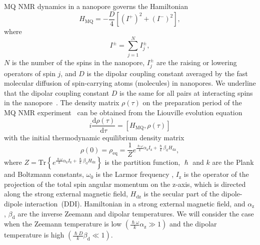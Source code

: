 \documentclass[review]{elsarticle}
\begin{document}
MQ NMR dynamics in a nanopore governs the Hamiltonian~\cite{Doronin_2019,Doronin_2009} 
%
\begin{equation}
    \label{eq:1}
    H_{\mathrm{MQ}} = - \dfrac{D}{4} \left[
        \left(I^{+}\right)^{2} 
        + \left(I^{-}\right)^{2} 
    \right] ,
\end{equation}
%
where 
%
\begin{equation}
    \label{eq:2}
    I^{\pm} = \sum\limits_{j=1}^{N} I_{j}^{\pm},
\end{equation}
%
$N$ is the number of the spins in the nanopore, $I^{\pm}_{j}$ are the raising or lowering operators of spin $j$, and $D$ is the dipolar coupling constant averaged by the fast molecular diffusion of spin-carrying atoms (molecules) in nanopores.
We underline that the dipolar coupling constant $D$ is the same for all pairs at interacting spins in the nanopore~\cite{Doronin_2019,Doronin_2009}.
The density matrix $\rho(\tau)$ on the preparation period of the MQ NMR experiment~\cite{Baum_1985} can be obtained from the Liouville evolution equation~\cite{Goldman_1970,Abragam_1982} 
%
\begin{equation}
    \label{eq:3}
    i\dfrac{\mathrm{d}\rho(\tau)}{\mathrm{d}\tau} = \left[
    H_\mathrm{MQ},\rho(\tau)
    \right]
\end{equation}
%
with the initial thermodynamic equilibrium density matrix 
%
\begin{equation}
    \label{eq:4}
       \rho(0) = \rho_\mathrm{eq} = \dfrac{1}{Z}
       e^{
            \frac{\hslash \omega}{k} \alpha_\mathrm{z} I_\mathrm{z} 
            + \frac{\hslash }{k} \beta_\mathrm{d} H_\mathrm{dz}
        },
\end{equation}
%
where 
$Z = \mathrm{Tr} \left\{ e^{\frac{\hslash \omega}{k} \alpha_\mathrm{z} I_\mathrm{z} + \frac{\hslash  }{k} \beta_\mathrm{d} H_\mathrm{dz}} \right\}$ is the partition function, 
$\hslash$ and $k$ are the Plank and Boltzmann constants, 
$\omega_{0}$  is the Larmor frequency , $I_\mathrm{z}$ is the operator of the projection of the total spin angular momentum on the z-axis, 
which is directed along the strong external magnetic field,  
$H_\mathrm{dz}$ is the secular part of the dipole-dipole interaction~(DDI).
Hamiltonian in a strong external magnetic field, and $\alpha_\mathrm{z}$, $\beta_\mathrm{d}$ are the inverse Zeemann and dipolar temperatures. 
We will consider the case when the Zeemann temperature is low $({\frac{\hslash \omega}{k} \alpha_\mathrm{z}}\gg 1)$ 
and the dipolar temperature is high $\left( \frac{\hslash{D}}{k}\beta_\mathrm{d} \ll 1\right)$.
\end{document}
